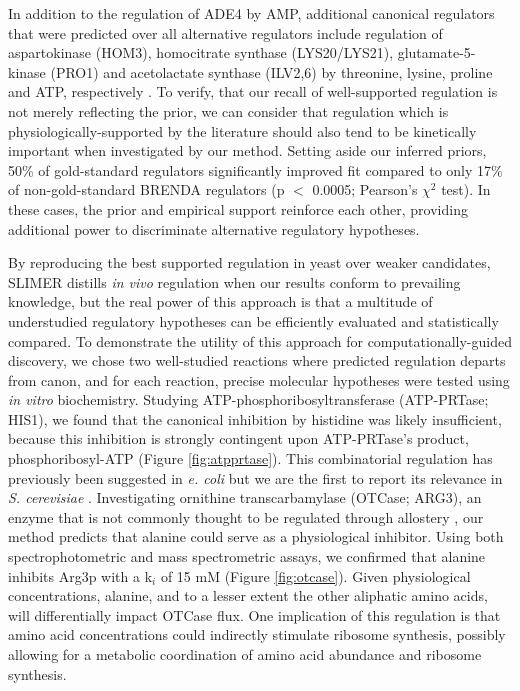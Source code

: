 In addition to the regulation of ADE4 by AMP, additional canonical regulators that were predicted over all alternative regulators include regulation of aspartokinase (HOM3), homocitrate synthase (LYS20/LYS21), glutamate-5-kinase (PRO1) and acetolactate synthase (ILV2,6) by threonine, lysine, proline and ATP, respectively \cite{WYNGAARDEN:1959wf, Jones:1982dn, Sekine:2007ej}. To verify, that our recall of well-supported regulation is not merely reflecting the prior, we can consider that regulation which is physiologically-supported by the literature should also tend to be kinetically important when investigated by our method.  Setting aside our inferred priors, 50\% of gold-standard regulators significantly improved fit compared to only 17\% of non-gold-standard BRENDA regulators (p $<$ 0.0005; Pearson's $\chi^{2}$ test). In these cases, the prior and empirical support reinforce each other, providing additional power to discriminate alternative regulatory hypotheses.

By reproducing the best supported regulation in yeast over weaker candidates, SLIMER distills \textit{in vivo} regulation when our results conform to prevailing knowledge, but the real power of this approach is that a multitude of understudied regulatory hypotheses can be efficiently evaluated and statistically compared.  To demonstrate the utility of this approach for computationally-guided discovery, we chose two well-studied reactions where predicted regulation departs from canon, and for each reaction, precise molecular hypotheses were tested using \textit{in vitro} biochemistry.  Studying ATP-phosphoribosyltransferase (ATP-PRTase; HIS1), we found that the canonical inhibition by histidine was likely insufficient, because this inhibition is strongly contingent upon ATP-PRTase's product, phosphoribosyl-ATP (Figure \ref{fig:atpprtase}).  This combinatorial regulation has previously been suggested in \textit{e. coli} but we are the first to report its relevance in \textit{S. cerevisiae} \cite{DallLarsen:1976wm}.  Investigating ornithine transcarbamylase (OTCase; ARG3), an enzyme that is not commonly thought to be regulated through allostery \cite{Jones:1982dn}, our method predicts that alanine could serve as a physiological inhibitor.  Using both spectrophotometric and mass spectrometric assays, we confirmed that alanine inhibits Arg3p with a k$_{i}$ of 15 mM (Figure \ref{fig:otcase}).  Given physiological concentrations, alanine, and to a lesser extent the other aliphatic amino acids, will differentially impact OTCase flux.  One implication of this regulation is that amino acid concentrations could indirectly stimulate ribosome synthesis, possibly allowing for a metabolic coordination of amino acid abundance and ribosome synthesis.

